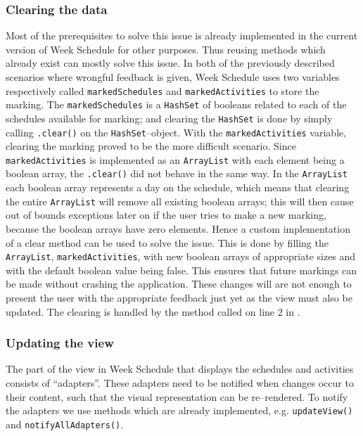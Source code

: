 \subsubsection{Clearing the data}
Most of the prerequisites to solve this issue is already implemented in the current version of Week Schedule for other purposes.
Thus reusing methods which already exist can mostly solve this issue.
In both of the previously described scenarios where wrongful feedback is given, Week Schedule uses two variables respectively called \texttt{markedSchedules} and \texttt{markedActivities} to store the marking.
The \texttt{markedSchedules} is a \texttt{HashSet} of booleans related to each of the schedules available for marking; and clearing the \texttt{HashSet} is done by simply calling \texttt{.clear()} on the \texttt{HashSet}--object.
With the \texttt{markedActivities} variable, clearing the marking proved to be the more difficult scenario.
Since \texttt{markedActivities} is implemented as an \texttt{ArrayList} with each element being a boolean array, the \texttt{.clear()} did not behave in the same way.
In the \texttt{ArrayList} each boolean array represents a day on the schedule, which means that clearing the entire \texttt{ArrayList} will remove all existing boolean arrays; this will then cause out of bounds exceptions later on if the user tries to make a new marking, because the boolean arrays have zero elements.
Hence a custom implementation of a clear method can be used to solve the issue.
This is done by filling the \texttt{ArrayList}, \texttt{markedActivities}, with new boolean arrays of appropriate sizes and with the default boolean value being false.
This ensures that future markings can be made without crashing the application.
These changes will are not enough to present the user with the appropriate feedback just yet as the view must also be updated.
The clearing is handled by the method called on line 2 in .

\subsubsection{Updating the view}
The part of the view in Week Schedule that displays the schedules and activities consists of \enquote{adapters}.
These adapters need to be notified when changes occur to their content, such that the visual representation can be re--rendered.
To notify the adapters we use methods which are already implemented, e.g. \texttt{updateView()} and \texttt{notifyAllAdapters()}.

